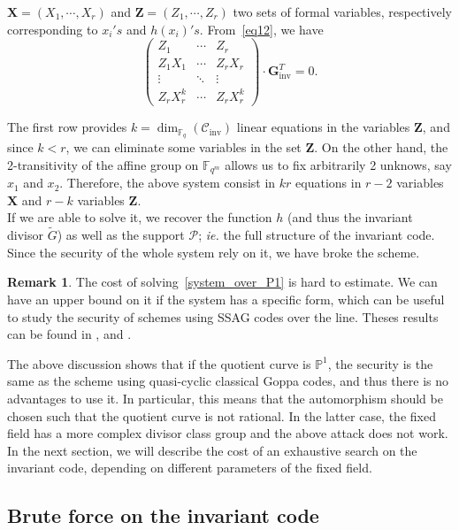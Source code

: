 \documentclass[10pt]{article}
\theoremstyle{definition}
\newtheorem{rq1}[thm]{Remark}
\theoremstyle{definition}
\theoremstyle{definition}
\newcommand{\cd}{\cdot}
\newcommand{\PP}{\mathbb{P}}
\newcommand{\Fqm}{\mathbb{F}_{q^m}}
\newcommand{\Fq}{\mathbb{F}_q}
\newcommand{\PR}{\mathcal{P}}
\begin{document}
$\mathbf{X} = (X_1,\cdots,X_r)$ and $\mathbf{Z} = (Z_1,\cdots,Z_r)$ two sets of formal variables, respectively corresponding to $x_i's$ and $h(x_i)'s$. From~\eqref{eq12}, we have
\begin{equation} \label{system_over_P1}
\begin{pmatrix}
Z_1 & \cdots & Z_r \\
Z_1X_1 & \cdots & Z_{r}X_{r} \\
\vdots & \ddots & \vdots \\
Z_rX_r^{k} & \cdots & Z_{r}X_{r}^k 
\end{pmatrix}
\cd \mathbf{G}_{\mathrm{inv}}^T= 0.
\end{equation}

 The first row provides $k=\dim_{\Fq}(\mathcal{C}_{\mathrm{inv}})$ linear equations in the variables $\mathbf{Z}$, and since $k < r$, we can eliminate some variables in the set $\mathbf{Z}$. On the other hand, the 2-transitivity of the affine group on $\Fqm$ allows us to fix arbitrarily 2 unknows, say $x_1$ and $x_2$. Therefore, the above system consist in $kr$ equations in $r-2$ variables $\mathbf{X}$ and $r-k$ variables $\mathbf{Z}$. \\
If we are able to solve it, we recover the function $h$ (and thus the invariant divisor $\tilde{G}$) as well as the support $\PR$; \textit{ie.} the full structure of the invariant code. Since the security of the whole system rely on it, we have broke the scheme.  

\begin{rq1} 
The cost of solving~\eqref{system_over_P1} is hard to estimate. We can have an upper bound on it if the system has a specific form, which can be useful to study the security of schemes using SSAG codes over the line. Theses results can be found in \cite{FOP}, \cite{FOP1} and \cite{FOP2}. 
\end{rq1}

The above discussion shows that if the quotient curve is $\PP^1$, the security is the same as the scheme using quasi-cyclic classical Goppa codes, and thus there is no advantages to use it. In particular, this means that the automorphism should be chosen such that the quotient curve is not rational. In the latter case, the fixed field has a more complex divisor class group and the above attack does not work. In the next section, we will describe the cost of an exhaustive search on the invariant code, depending on different parameters of the fixed field. 


\subsection{Brute force on the invariant code} \label{bruteforce}
\end{document}

